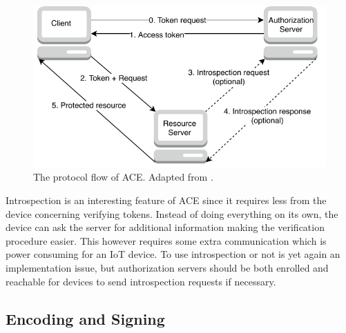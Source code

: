 \documentclass[0-thesis.tex]{subfiles}
\begin{document}
\begin{figure}
    \caption{The protocol flow of ACE. Adapted from \parencite{ace}.}
    \label{fig:ace-flow}
    \includegraphics{images/ace.pdf}
\end{figure}

Introspection is an interesting feature of ACE since it requires less from the device
concerning verifying tokens. Instead of doing everything on its own, the device can ask
the server for additional information making the verification procedure easier. This
however requires some extra communication which is power consuming for an IoT device. To
use introspection or not is yet again an implementation issue, but authorization servers
should be both enrolled and reachable for devices to send introspection requests if
necessary.

\subsection{Encoding and Signing}
\label{ssec:encoding-signing}
\end{document}

